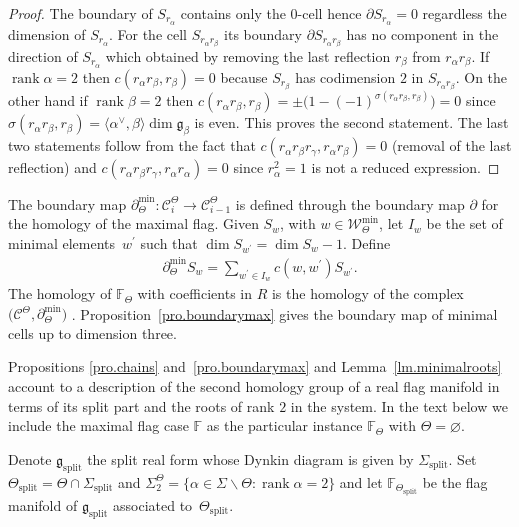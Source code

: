 \documentclass[pdftex]{sigma}
\numberwithin{equation}{section}
\begin{document}
\begin{proof}The boundary of $S_{r_{\alpha }}$ contains only the $0$-cell hence $\partial S_{r_{\alpha }}=0$ regardless the dimension of $S_{r_{\alpha }}$. For the cell $S_{r_{\alpha }r_{\beta }}$ its boundary $\partial S_{r_{\alpha}r_{\beta }}$ has no component in the direction of $S_{r_{\alpha }}$ which obtained by removing the last reflection $r_{\beta }$ from $r_{\alpha}r_{\beta }$. If $\operatorname{rank}\alpha =2$ then $c( r_{\alpha}r_{\beta },r_{\beta }) =0$ because $S_{r_{\beta }}$ has codimension $2 $ in $S_{r_{\alpha }r_{\beta }}$. On the other hand if $\operatorname{rank} \beta =2$ then $c(r_{\alpha }r_{\beta },r_{\beta })=\pm \big( 1-(-1) ^{\sigma ( r_{\alpha }r_{\beta },r_{\beta } ) }\big)=0 $ since $\sigma ( r_{\alpha }r_{\beta },r_{\beta }) =\langle \alpha^\vee,\beta \rangle\dim \mathfrak{g}_{\beta }$ is even. This proves the second statement. The last two statements follow from the fact that $c( r_{\alpha }r_{\beta }r_{\gamma },r_{\alpha }r_{\beta })=0$ (removal of the last reflection) and $c( r_{\alpha }r_{\beta}r_{\gamma },r_{\alpha }r_{\alpha }) =0$ since $r_{\alpha }^{2}=1$ is not a reduced expression.
\end{proof}

The boundary map $\partial_\Theta^{\min}\colon \mathcal{C}_i^\Theta\longrightarrow \mathcal{C}_{i-1}^\Theta$ is defined through the boundary map $\partial$ for the homology of the maximal flag. Given $S_w$, with $w\in \mathcal{W}_\Theta^{\min}$, let $I_w$ be the set of minimal elements~$w^{\prime }$ such that $\dim S_{w^{\prime }}=\dim S_w-1$. Define
\begin{gather*} \partial^{\min}_\Theta S_w=\sum_{w^{\prime }\in I_w}c(w,w^{\prime })S_{w^{\prime }}.\end{gather*} The homology
of $\mathbb{F}_\Theta$ with coefficients in $R$ is the homo\-logy of the complex $\big(\mathcal{C}^\Theta,\partial^{\min}_\Theta\big)$ \cite[Theorem~3.4]{RSM}. Proposition~\ref{pro.boundarymax} gives the boundary map of minimal cells up to dimension three.

Propositions \ref{pro.chains} and~\ref{pro.boundarymax} and Lemma~\ref{lm.minimalroots} account to a description of the second homology group of a real flag manifold in terms of its split part and the roots of rank $2$ in the system. In the text below we include the maximal flag case $\mathbb F$ as the particular instance $\mathbb F_\Theta$ with $\Theta=\varnothing$.

Denote $\mathfrak{g }_{\mathrm{split}}$ the split real form whose Dynkin diagram is given by $\Sigma_{\mathrm{split}}$. Set $\Theta_{\mathrm{split}}=\Theta\cap\Sigma_{\mathrm{split}}$ and $\Sigma _{2}^{\Theta }=\{\alpha \in \Sigma \backslash \Theta \colon \operatorname{rank}\alpha =2\}$ and let $\mathbb{F}_{\Theta_{\mathrm{split}}}$ be the flag manifold of $\mathfrak{g }_{\mathrm{split}}$ associated to~$\Theta_{\mathrm{split}}$.
\end{document}
